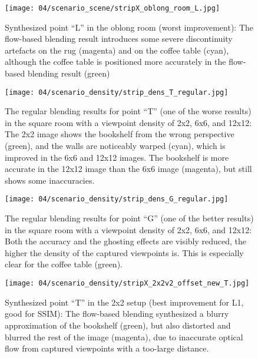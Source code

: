 \begin{figure}
  \centering
  \texttt{[image: 04/scenario\_scene/stripX\_oblong\_room\_L.jpg]}
  \caption[Viewpoint ``L'' in the oblong room]{Synthesized point ``L'' in the oblong room (worst improvement): The flow-based blending result introduces some severe discontinuity artefacts on the rug (magenta) and on the coffee table (cyan), although the coffee table is positioned more accurately in the flow-based blending result (green)}
  \label{fig:scene_oblong_L}
\end{figure}


\begin{figure}
		\centering
    \texttt{[image: 04/scenario\_density/strip\_dens\_T\_regular.jpg]}
		\caption[Regular blending results for viewpoint ``T'' with different densities]{The regular blending results for point ``T'' (one of the worse results) in the square room with a viewpoint density of 2x2, 6x6, and 12x12: The 2x2 image shows the bookshelf from the wrong perspective (green), and the walls are noticeably warped (cyan), which is improved in the 6x6 and 12x12 images. The bookshelf is more accurate in the 12x12 image than the 6x6 image (magenta), but still shows some inaccuracies.}
		\label{fig:density_regular_T}
\end{figure}

\begin{figure}
		\centering
    \texttt{[image: 04/scenario\_density/strip\_dens\_G\_regular.jpg]}
		\caption[Regular blending results for viewpoint ``G'' with different densities] {The regular blending results for point ``G'' (one of the better results) in the square room with a viewpoint density of 2x2, 6x6, and 12x12: Both the accuracy and the ghosting effects are visibly reduced, the higher the density of the captured viewpoints is. This is especially clear for the coffee table (green).}
		\label{fig:density_regular_G}
\end{figure}

\begin{figure}
  \centering
  \texttt{[image: 04/scenario\_density/stripX\_2x2v2\_offset\_new\_T.jpg]}
  \caption[Viewpoint ``T'' in the 2x2 setup]{Synthesized point ``T'' in the 2x2 setup (best improvement for L1, good for SSIM): The flow-based blending synthesized a blurry approximation of the bookshelf (green), but also distorted and blurred the rest of the image (magenta), due to inaccurate optical flow from captured viewpoints with a too-large distance.}
  \label{fig:dens_2x2_T}
\end{figure}

